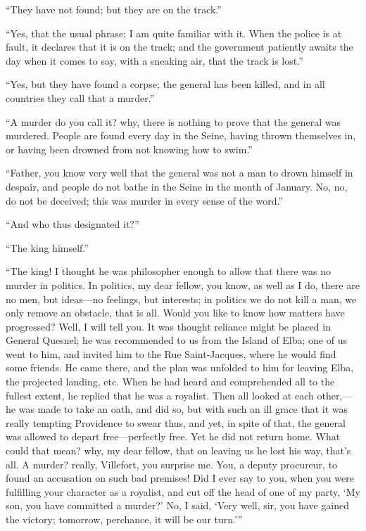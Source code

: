 “They have not found; but they are on the track.”

“Yes, that the usual phrase; I am quite familiar with it. When the
police is at fault, it declares that it is on the track; and the
government patiently awaits the day when it comes to say, with a
sneaking air, that the track is lost.”

“Yes, but they have found a corpse; the general has been killed, and in
all countries they call that a murder.”

“A murder do you call it? why, there is nothing to prove that the
general was murdered. People are found every day in the Seine, having
thrown themselves in, or having been drowned from not knowing how to
swim.”

“Father, you know very well that the general was not a man to drown
himself in despair, and people do not bathe in the Seine in the month
of January. No, no, do not be deceived; this was murder in every sense
of the word.”

“And who thus designated it?”

“The king himself.”

“The king! I thought he was philosopher enough to allow that there was
no murder in politics. In politics, my dear fellow, you know, as well
as I do, there are no men, but ideas—no feelings, but interests; in
politics we do not kill a man, we only remove an obstacle, that is all.
Would you like to know how matters have progressed? Well, I will tell
you. It was thought reliance might be placed in General Quesnel; he was
recommended to us from the Island of Elba; one of us went to him, and
invited him to the Rue Saint-Jacques, where he would find some friends.
He came there, and the plan was unfolded to him for leaving Elba, the
projected landing, etc. When he had heard and comprehended all to the
fullest extent, he replied that he was a royalist. Then all looked at
each other,—he was made to take an oath, and did so, but with such an
ill grace that it was really tempting Providence to swear thus, and
yet, in spite of that, the general was allowed to depart free—perfectly
free. Yet he did not return home. What could that mean? why, my dear
fellow, that on leaving us he lost his way, that’s all. A murder?
really, Villefort, you surprise me. You, a deputy procureur, to found
an accusation on such bad premises! Did I ever say to you, when you
were fulfilling your character as a royalist, and cut off the head of
one of my party, ‘My son, you have committed a murder?’ No, I said,
‘Very well, sir, you have gained the victory; tomorrow, perchance, it
will be our turn.’”

